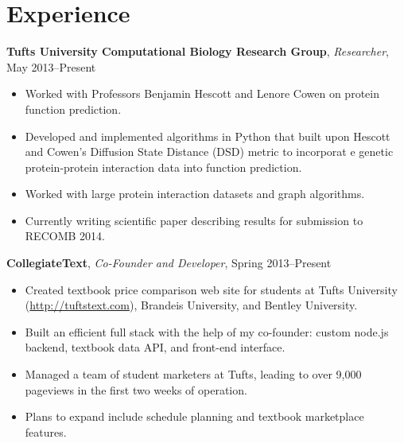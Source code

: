 \vspace{-15pt}
\section*{Experience}
{\bf Tufts University Computational Biology Research Group}, {\em Researcher}, May 2013--Present\\
\vspace*{-.15in} 
\begin{itemize}[topsep=0pt,itemsep=-1pt]
    \item Worked with Professors Benjamin Hescott and Lenore Cowen on protein function prediction.
    \item Developed and implemented algorithms in Python that built upon Hescott and Cowen's Diffusion State Distance (DSD) metric to incorporat  e genetic protein-protein interaction data into function prediction.
    \item Worked with large protein interaction datasets and graph algorithms.
    \item Currently writing scientific paper describing results for submission to RECOMB 2014.
\end{itemize}
\vspace{6pt}
{\bf CollegiateText}, {\em Co-Founder and Developer}, Spring 2013--Present\\
\vspace*{-.15in}
\begin{itemize}[topsep=0pt,itemsep=-1pt]
            \item Created textbook price comparison web site for students at Tufts University (\url{http://tuftstext.com}), Brandeis University, and Bentley University.
            \item Built an efficient full stack with the help of my co-founder: custom node.js backend, textbook data API, and front-end interface. 
            \item Managed a team of student marketers at Tufts, leading to over 9,000 pageviews in the first two weeks of operation.
            \item Plans to expand include schedule planning and textbook marketplace features.
        \end{itemize}
